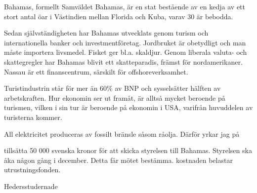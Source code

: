 \documentclass[../_main/handlingar.tex]{subfiles}
\begin{document}

Bahamas, formellt Samväldet Bahamas, är en stat bestående av en kedja av ett stort antal öar i Västindien mellan Florida och Kuba, varav 30 är bebodda.

Sedan självständigheten har Bahamas utvecklats genom turism och internationella banker och investmentföretag. Jordbruket är obetydligt och man måste importera livsmedel. Fisket ger bl.a. skaldjur. Genom liberala valuta- och skattegregler har Bahamas blivit ett skatteparadis, främst för nordamerikaner. Nassau är ett finanscentrum, särskilt för offshoreverksamhet.

Turistindustrin står för mer än 60\% av BNP och sysselsätter hälften av arbetskraften. Hur ekonomin ser ut framåt, är alltså mycket beroende på turismen, vilken i sin tur är beroende på ekonomin i USA, varifrån huvuddelen av turisterna kommer.

All elektricitet produceras av fossilt bränsle såsom råolja. Därför yrkar jag på

\begin{attsatser}
    \att tillsätta 50 000 svenska kronor för att skicka styrelsen till Bahamas.
    \att Styrelsen ska åka någon gång i december. Detta får mötet bestämma.
    \att kostnaden belastar utrustningsfonden.
\end{attsatser}

\begin{signatures}{1}
    \signature{Oddput Clementin}{Hedersstudernade}
\end{signatures}
\end{document}
